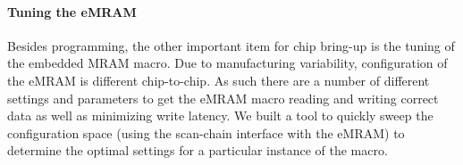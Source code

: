 \paragraph{Tuning the eMRAM}
Besides programming, the other important item for chip bring-up is the tuning of the embedded MRAM macro.
% 
Due to manufacturing variability, configuration of the eMRAM is different chip-to-chip.
% 
As such there are a number of different settings and parameters to get the eMRAM macro reading and writing correct data as well as minimizing write latency.
% 
We built a tool to quickly sweep the configuration space (using the scan-chain interface with the eMRAM) to determine the optimal settings for a particular instance of the macro. 
